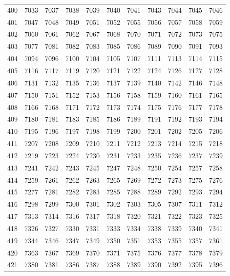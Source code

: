 \begin{longtable}{|r|rrrrrrrrrr|}
  400 & 7033 & 7037 & 7038 & 7039 & 7040 & 7041 & 7043 & 7044 & 7045 & 7046 \\ 
  401 & 7047 & 7048 & 7049 & 7051 & 7052 & 7055 & 7056 & 7057 & 7058 & 7059 \\ 
  402 & 7060 & 7061 & 7062 & 7067 & 7068 & 7070 & 7071 & 7072 & 7073 & 7075 \\ 
  403 & 7077 & 7081 & 7082 & 7083 & 7085 & 7086 & 7089 & 7090 & 7091 & 7093 \\ 
  404 & 7094 & 7096 & 7100 & 7104 & 7105 & 7107 & 7111 & 7113 & 7114 & 7115 \\ 
  405 & 7116 & 7117 & 7119 & 7120 & 7121 & 7122 & 7124 & 7126 & 7127 & 7128 \\ 
  406 & 7131 & 7132 & 7135 & 7136 & 7137 & 7139 & 7140 & 7142 & 7146 & 7148 \\ 
  407 & 7150 & 7151 & 7152 & 7153 & 7156 & 7158 & 7159 & 7160 & 7161 & 7165 \\ 
  408 & 7166 & 7168 & 7171 & 7172 & 7173 & 7174 & 7175 & 7176 & 7177 & 7178 \\ 
  409 & 7180 & 7181 & 7183 & 7185 & 7186 & 7189 & 7191 & 7192 & 7193 & 7194 \\ 
  410 & 7195 & 7196 & 7197 & 7198 & 7199 & 7200 & 7201 & 7202 & 7205 & 7206 \\ 
  411 & 7207 & 7208 & 7209 & 7210 & 7211 & 7212 & 7213 & 7214 & 7215 & 7218 \\ 
  412 & 7219 & 7223 & 7224 & 7230 & 7231 & 7233 & 7235 & 7236 & 7237 & 7239 \\ 
  413 & 7241 & 7242 & 7243 & 7245 & 7247 & 7248 & 7250 & 7254 & 7257 & 7258 \\ 
  414 & 7259 & 7261 & 7262 & 7263 & 7265 & 7269 & 7272 & 7273 & 7275 & 7276 \\ 
  415 & 7277 & 7281 & 7282 & 7283 & 7285 & 7288 & 7289 & 7292 & 7293 & 7294 \\ 
  416 & 7298 & 7299 & 7300 & 7301 & 7302 & 7303 & 7305 & 7307 & 7311 & 7312 \\ 
  417 & 7313 & 7314 & 7316 & 7317 & 7318 & 7320 & 7321 & 7322 & 7323 & 7325 \\ 
  418 & 7326 & 7327 & 7330 & 7331 & 7333 & 7334 & 7338 & 7339 & 7340 & 7341 \\ 
  419 & 7344 & 7346 & 7347 & 7349 & 7350 & 7351 & 7353 & 7355 & 7357 & 7361 \\ 
  420 & 7363 & 7367 & 7369 & 7370 & 7371 & 7375 & 7376 & 7377 & 7378 & 7379 \\ 
  421 & 7380 & 7381 & 7386 & 7387 & 7388 & 7389 & 7390 & 7392 & 7395 & 7396 \\ 

\end{longtable}
